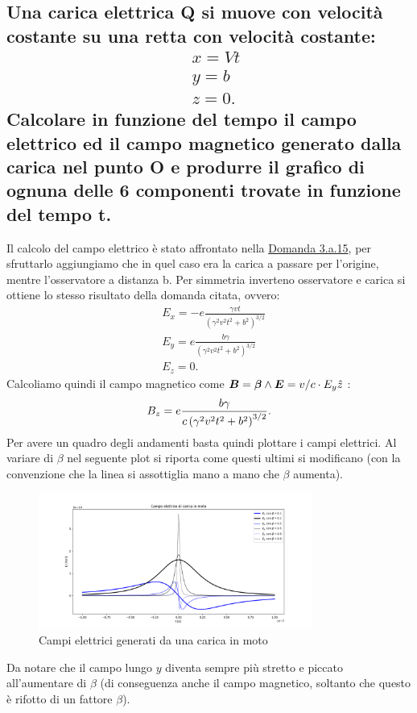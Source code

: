 \subsection[]{Una carica elettrica Q si muove con velocità costante su una retta con velocità costante:
\begin{align*}
	 &x=Vt \\
	 &y=b \\ 
	 &z=0
.\end{align*}
Calcolare in funzione del tempo il campo elettrico ed il campo magnetico generato dalla carica nel punto O e produrre il grafico di ognuna delle 6 componenti trovate in funzione del tempo t.}
\label{sec:3.b.6}
Il calcolo del campo elettrico è stato affrontato nella \hyperref[sec:3.a.15]{Domanda 3.a.15}, per sfruttarlo aggiungiamo che in quel caso era la carica a passare per l'origine, mentre l'osservatore a distanza b. Per simmetria inverteno osservatore e carica si ottiene lo stesso risultato della domanda citata, ovvero:
\begin{align*}
	&E_x = -e \frac{\gamma vt}{\left( \gamma^2v^2t^2 + b^2 \right)^{3 /2} }\\
	&E_y = e \frac{b\gamma }{\left( \gamma^2v^2t^2 + b^2 \right)^{3 /2}}\\
	&E_z = 0
.\end{align*}
Calcoliamo quindi il campo magnetico come $\boldsymbol{B}= \boldsymbol{\beta}\wedge \boldsymbol{E}=v/c \cdot E_{y} \hat{z}$ :
\[
	B_z = e \frac{b\gamma }{c\left( \gamma^2v^2t^2 + b^2 \right)^{3 /2}}\\
.\] 
Per avere un quadro degli andamenti basta quindi plottare i campi elettrici. Al variare di $\beta$ nel seguente plot si riporta come questi ultimi si modificano (con la convenzione che la linea si assottiglia mano a mano che $\beta$ aumenta).
\begin{figure}[H]
	\centering
	\includegraphics[width=0.8\textwidth]{immagini/carica_in_moto.png}
	\caption{Campi elettrici generati da una carica in moto}
	\label{fig:campo_carica_moto}
\end{figure}
Da notare che il campo lungo $y$ diventa sempre più stretto e piccato all'aumentare di $\beta$ (di conseguenza anche il campo magnetico, soltanto che questo è rifotto di un fattore $\beta$).

